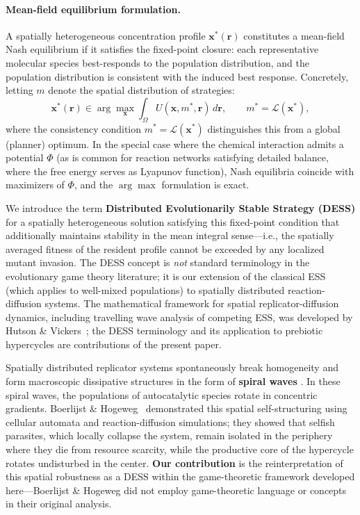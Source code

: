 \documentclass[12pt,a4paper]{article}
\theoremstyle{remark}
\begin{document}
\paragraph{Mean-field equilibrium formulation.}
A spatially heterogeneous concentration profile $\mathbf{x}^*(\mathbf{r})$ constitutes a mean-field Nash equilibrium if it satisfies the fixed-point closure: each representative molecular species best-responds to the population distribution, and the population distribution is consistent with the induced best response. Concretely, letting $m$ denote the spatial distribution of strategies:
\begin{equation}
\mathbf{x}^*(\mathbf{r}) \in \arg\max_{\mathbf{x}} \int_\Omega U(\mathbf{x}, m^*, \mathbf{r}) \, d\mathbf{r}, \qquad m^* = \mathcal{L}(\mathbf{x}^*),
\end{equation}
where the consistency condition $m^* = \mathcal{L}(\mathbf{x}^*)$ distinguishes this from a global (planner) optimum. In the special case where the chemical interaction admits a potential $\Phi$ (as is common for reaction networks satisfying detailed balance, where the free energy serves as Lyapunov function), Nash equilibria coincide with maximizers of $\Phi$, and the $\arg\max$ formulation is exact.

We introduce the term \textbf{Distributed Evolutionarily Stable Strategy (DESS)} for a spatially heterogeneous solution satisfying this fixed-point condition that additionally maintains stability in the mean integral sense---i.e., the spatially averaged fitness of the resident profile cannot be exceeded by any localized mutant invasion. The DESS concept is \emph{not} standard terminology in the evolutionary game theory literature; it is our extension of the classical ESS (which applies to well-mixed populations) to spatially distributed reaction-diffusion systems. The mathematical framework for spatial replicator-diffusion dynamics, including travelling wave analysis of competing ESS, was developed by Hutson \& Vickers~\citep{ReplicatorDiffusion}; the DESS terminology and its application to prebiotic hypercycles are contributions of the present paper.

Spatially distributed replicator systems spontaneously break homogeneity and form macroscopic dissipative structures in the form of \textbf{spiral waves} \citep{SpiralWaves}. In these spiral waves, the populations of autocatalytic species rotate in concentric gradients. Boerlijst \& Hogeweg~\citep{SpiralWaves,HypercycleInfinite} demonstrated this spatial self-structuring using cellular automata and reaction-diffusion simulations; they showed that selfish parasites, which locally collapse the system, remain isolated in the periphery where they die from resource scarcity, while the productive core of the hypercycle rotates undisturbed in the center. \textbf{Our contribution} is the reinterpretation of this spatial robustness as a DESS within the game-theoretic framework developed here---Boerlijst \& Hogeweg did not employ game-theoretic language or concepts in their original analysis.
\end{document}
